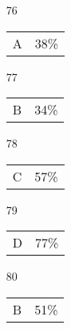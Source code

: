 \documentclass[12pt]{article}
\begin{document}
\begin{multicols}{5}
\begin{enumerate}
\item[]
\item[76] \begin{tabular}{cc} A & 38\%\end{tabular}
\item[77] \begin{tabular}{cc} B & 34\%\end{tabular}
\item[78] \begin{tabular}{cc} C & 57\%\end{tabular}
\item[79] \begin{tabular}{cc} D & 77\%\end{tabular}
\item[80] \begin{tabular}{cc} B & 51\%\end{tabular}

\item[]


\end{enumerate}
\end{multicols}
\end{document}
